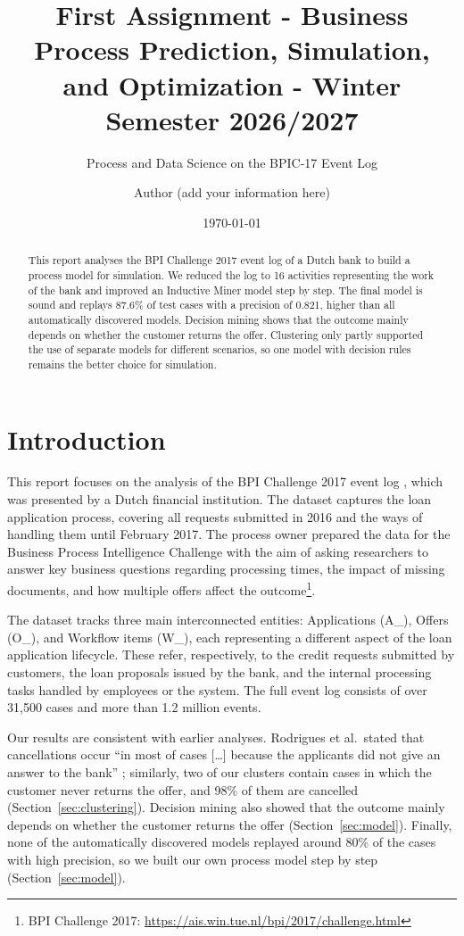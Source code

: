 \documentclass[
  english,        %
  font=times,     %
  twocolumn,      %
]{tumarticle}
\title{First Assignment - Business Process Prediction, Simulation, and Optimization - Winter Semester 2026/2027}
\subtitle{Process and Data Science on the BPIC-17 Event Log}
\author[email=author@tum.de]{Author (add your information here)}
\date\today
\newcommand{\fn}[2]{\footnote{\tiny #1: \url{#2}}}
\begin{document}
\maketitle

\begin{abstract}
This report analyses the BPI Challenge 2017 event log of a Dutch bank to build a process model for simulation. We reduced the log to 16 activities representing the work of the bank and improved an Inductive Miner model step by step. The final model is sound and replays 87.6\% of test cases with a precision of 0.821, higher than all automatically discovered models. Decision mining shows that the outcome mainly depends on whether the customer returns the offer. Clustering only partly supported the use of separate models for different scenarios, so one model with decision rules remains the better choice for simulation.
\end{abstract}
%

\section{Introduction}
This report focuses on the analysis of the BPI Challenge 2017 event log \cite{vandongen2017}, which was presented by a Dutch financial institution. The dataset captures the loan application process, covering all requests submitted in 2016 and the ways of handling them until February 2017. The process owner prepared the data for the Business Process Intelligence Challenge with the aim of asking researchers to answer key business questions regarding processing times, the impact of missing documents, and how multiple offers affect the outcome\fn{BPI Challenge 2017}{https://ais.win.tue.nl/bpi/2017/challenge.html}.

The dataset tracks three main interconnected entities: Applications (A\_), Offers (O\_), and Workflow items (W\_), each representing a different aspect of the loan application lifecycle. These refer, respectively, to the credit requests submitted by customers, the loan proposals issued by the bank, and the internal processing tasks handled by employees or the system. The full event log consists of over 31,500 cases and more than 1.2 million events.

Our results are consistent with earlier analyses. Rodrigues et al.\ stated that cancellations occur ``in most of cases [\ldots] because the applicants did not give an answer to the bank'' \cite[Sec.~7]{rodrigues2017}; similarly, two of our clusters contain cases in which the customer never returns the offer, and 98\% of them are cancelled (Section~\ref{sec:clustering}). Decision mining also showed that the outcome mainly depends on whether the customer returns the offer (Section~\ref{sec:model}). Finally, none of the automatically discovered models replayed around 80\% of the cases with high precision, so we built our own process model step by step (Section~\ref{sec:model}).
\end{document}
